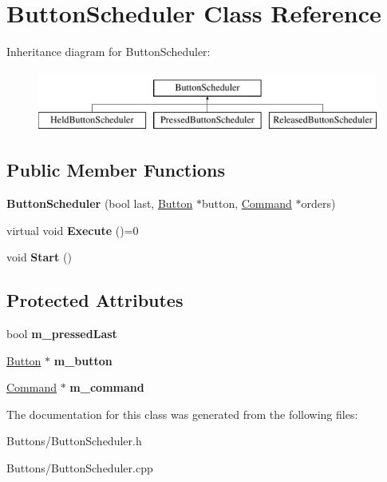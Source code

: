 \hypertarget{classButtonScheduler}{
\section{ButtonScheduler Class Reference}
\label{classButtonScheduler}
}
Inheritance diagram for ButtonScheduler:\begin{figure}[H]
\begin{center}
\leavevmode
\includegraphics[height=2.000000cm]{classButtonScheduler}
\end{center}
\end{figure}
\subsection*{Public Member Functions}
\begin{DoxyCompactItemize}
\item 
\hypertarget{classButtonScheduler_a487e83911d61433d77a9da9dee8bd53c}{
{\bfseries ButtonScheduler} (bool last, \hyperlink{classButton}{Button} $\ast$button, \hyperlink{classCommand}{Command} $\ast$orders)}
\label{classButtonScheduler_a487e83911d61433d77a9da9dee8bd53c}

\item 
\hypertarget{classButtonScheduler_a42c07eb2ec07a232975e7b7f3378e9b4}{
virtual void {\bfseries Execute} ()=0}
\label{classButtonScheduler_a42c07eb2ec07a232975e7b7f3378e9b4}

\item 
\hypertarget{classButtonScheduler_a86ec78cade4286ed41ceb76427d5a1e8}{
void {\bfseries Start} ()}
\label{classButtonScheduler_a86ec78cade4286ed41ceb76427d5a1e8}

\end{DoxyCompactItemize}
\subsection*{Protected Attributes}
\begin{DoxyCompactItemize}
\item 
\hypertarget{classButtonScheduler_ac11c7b5b0761bd92d03f7cdbeda47ead}{
bool {\bfseries m\_\-pressedLast}}
\label{classButtonScheduler_ac11c7b5b0761bd92d03f7cdbeda47ead}

\item 
\hypertarget{classButtonScheduler_a98e63ff8b1f887de6e623fccfa1d14d8}{
\hyperlink{classButton}{Button} $\ast$ {\bfseries m\_\-button}}
\label{classButtonScheduler_a98e63ff8b1f887de6e623fccfa1d14d8}

\item 
\hypertarget{classButtonScheduler_abb81bde7c49804982a6892cc2b2368a5}{
\hyperlink{classCommand}{Command} $\ast$ {\bfseries m\_\-command}}
\label{classButtonScheduler_abb81bde7c49804982a6892cc2b2368a5}

\end{DoxyCompactItemize}


The documentation for this class was generated from the following files:\begin{DoxyCompactItemize}
\item 
Buttons/ButtonScheduler.h\item 
Buttons/ButtonScheduler.cpp\end{DoxyCompactItemize}
